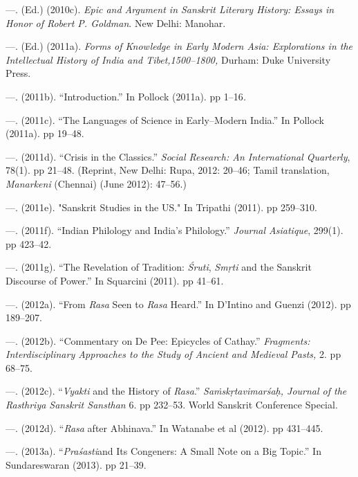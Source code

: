  \item —. (Ed.) (2010c). \textit{Epic and Argument in Sanskrit Literary History: Essays in Honor of Robert P. Goldman}. New Delhi: Manohar.

 \item —. (Ed.) (2011a). \textit{Forms of Knowledge in Early Modern Asia: Explorations in the Intellectual History of India and Tibet,1500–1800, }Durham: Duke University Press.

 \item —. (2011b). “Introduction.” In Pollock (2011a). pp 1–16\textit{.}

 \item —. (2011c). “The Languages of Science in Early–Modern India.” In Pollock (2011a). pp 19–48.

 \item —. (2011d). “Crisis in the Classics.” \textit{ Social Research: An International Quarterly}, 78(1). pp 21–48. (Reprint, New Delhi: Rupa, 2012: 20–46; Tamil translation, \textit{Manarkeni} (Chennai) (June 2012): 47–56.)

 \item —. (2011e). "Sanskrit Studies in the US." In Tripathi (2011). pp 259–310. 

 \item —. (2011f). “Indian Philology and India’s Philology.” \textit{Journal Asiatique}, 299(1). pp 423–42.

 \item —. (2011g). “The Revelation of Tradition: \textit{Śruti}, \textit{Smṛti} and the Sanskrit Discourse of Power.” In Squarcini (2011). pp 41–61.

 \item —. (2012a). “From \textit{Rasa} Seen to \textit{Rasa} Heard.” In D’Intino and Guenzi (2012). pp 189–207.

 \item —. (2012b). “Commentary on De Pee: Epicycles of Cathay.” \textit{Fragments: Interdisciplinary Approaches to the Study of Ancient and Medieval Pasts,} 2. pp 68–75.

 \item —. (2012c). “\textit{Vyakti} and the History of \textit{Rasa}.” \textit{Saṁskṛtavimarśaḥ, Journal of the Rasthriya Sanskrit Sansthan} 6. pp 232–53. World Sanskrit Conference Special.

 \item —. (2012d). “\textit{Rasa} after Abhinava.” In Watanabe et al (2012). pp 431–445.

 \item —. (2013a). “\textit{Praśasti}and Its Congeners: A Small Note on a Big Topic.” In Sundareswaran (2013). pp 21–39.

